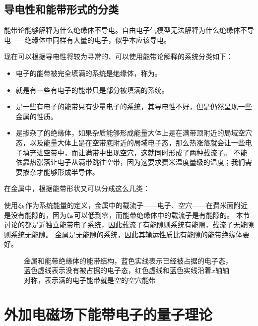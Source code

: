 \subsection{导电性和能带形式的分类}\label{sec:conductor-classification}

能带论能够解释为什么绝缘体不导电。自由电子气模型无法解释为什么绝缘体不导电——绝缘体中同样有大量的电子，似乎本应该导电。


现在可以根据导电性将较为寻常的、可以使用能带论解释的系统分类如下：
\begin{itemize}
    \item 电子的能带被完全填满的系统是绝缘体，称为。
    \item {}就是有一些有电子的能带只是部分被填满的系统。
    \item {}是一些有电子的能带只有少量电子的系统，其导电性不好，但是仍然呈现一些金属的性质。
    \item {}是掺杂了的绝缘体，如果杂质能够形成能量大体上是在满带顶附近的局域空穴态，以及能量大体上是在空带底附近的局域电子态，那么热涨落就会让一些电子填充进空带中，而让满带中出现空穴，这就同时形成了两种载流子。
    不能依靠热涨落让电子从满带跳往空带，因为这要求费米温度量级的温度；我们需要掺杂才能够形成半导体。
\end{itemize}

在金属中，根据能带形状又可以分成这么几类：

使用$\xi_{\vb*{k}}$作为系统能量的定义，金属中的载流子——电子、空穴——在费米面附近是没有能隙的，因为$\xi_{\vb*{k}}$可以低到零，而能带绝缘体中的载流子是有能隙的。
本节讨论的都是近独立能带电子系统，因此载流子有能隙则系统有能隙，载流子无能隙则系统无能隙。
金属是无能隙的系统，因此其输运性质比有能隙的能带绝缘体要好。

\begin{figure}
    \centering
    \caption{金属和能带绝缘体的能带结构，蓝色实线表示已经被占据的电子态，蓝色虚线表示没有被占据的电子态，红色虚线和蓝色实线沿着$x$轴轴对称，表示满的电子能带就是空的空穴能带}
\end{figure}

\section{外加电磁场下能带电子的量子理论}


